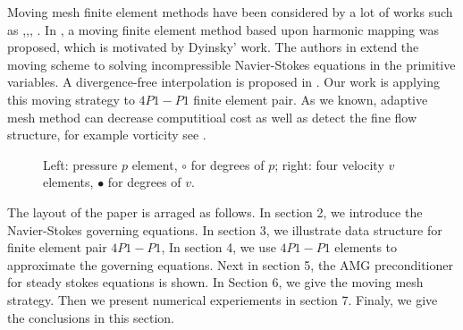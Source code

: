 \documentclass[a4paper, 11pt]{article}
\begin{document}
    Moving mesh finite element methods have been considered by a lot
    of works such as
    \cite{Winslow1966NUMERICAL},\cite{dvinsky1991adaptive},\cite{cao1999anr},
    \cite{li2001mesh}. In \cite{li2001mesh}, a moving finite element
    method based upon harmonic mapping was proposed, which is
    motivated by Dyinsky' work. The authors in\cite{di2005moving}
    extend the moving scheme to solving incompressible Navier-Stokes
    equations in the primitive variables. A divergence-free
    interpolation is proposed in \cite{di2005moving}. Our work is
    applying this moving strategy to $4P1-P1$ finite element pair. As
    we known, adaptive mesh method can decrease computitioal cost as
    well as detect the fine flow structure, for example vorticity see
    \cite{popiolek2006numerical}.

    \begin{figure}
      \centering    
      \caption{Left: pressure $p$ element, $\circ$ for degrees of $p$; 
               right: four velocity $v$ elements, $\bullet$ for degrees
               of $v$.}
      \label{fig::p-v}       
    \end{figure}
      
       The layout of the paper is arraged as follows. In section 2, we
    introduce the Navier-Stokes governing equations. In section 3, we
    illustrate data structure for finite element pair $4P1-P1$, In
    section 4, we use $4P1-P1$ elements to approximate the governing
    equations. Next in section 5, the AMG preconditioner for steady
    stokes equations is shown. In Section 6, we give the moving mesh
    strategy. Then we present numerical experiements in section 7. 
    Finaly, we give the conclusions in this section.

    
\end{document}
